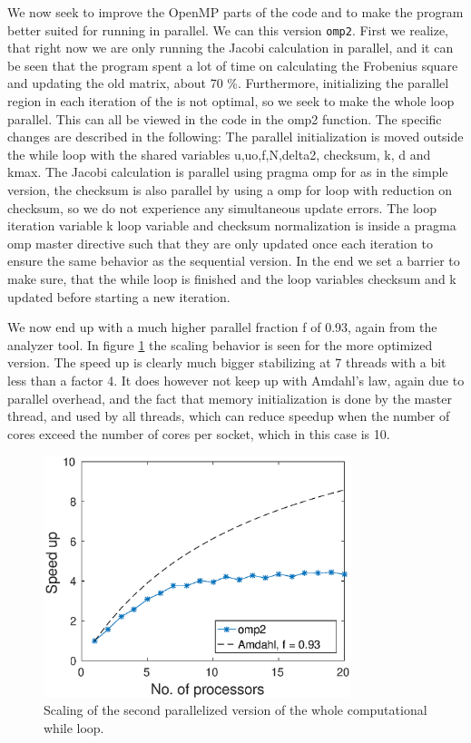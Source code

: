 We now seek to improve the OpenMP parts of the code and to make the program better suited for running in parallel. We can this version \texttt{omp2}. First we realize, that right now we are only running the Jacobi calculation in parallel, and it can be seen that the program spent a lot of time on calculating the Frobenius square and updating the old matrix, about 70 \%. Furthermore, initializing the parallel region in each iteration of the is not optimal, so we seek to make the whole loop parallel. This can all be viewed in the code in the omp2 function. The specific changes are described in the following: The parallel initialization is moved outside the while loop with the shared variables u,uo,f,N,delta2, checksum, k, d and kmax. The Jacobi calculation is parallel using pragma omp for as in the simple version, the checksum is also parallel by using a omp for loop with reduction on checksum, so we do not experience any simultaneous update errors. The loop iteration variable k loop variable and checksum normalization is inside a pragma omp master directive such that they are only updated once each iteration to ensure the same behavior as the sequential version. In the end we set a barrier to make sure, that the while loop is finished and the loop variables checksum and k updated before starting a new iteration.

We now end up with a much higher parallel fraction f of 0.93, again from the analyzer tool. In figure \ref{fig:omp2_scale} the scaling behavior is seen for the more optimized version. The speed up is clearly much bigger stabilizing at 7 threads with a bit less than a factor 4. It does however not keep up with Amdahl's law, again due to parallel overhead, and the fact that memory initialization is done by the master thread, and used by all threads, which can reduce speedup when the number of cores exceed the number of cores per socket, which in this case is 10.

\begin{figure}[h!]
\centering
\includegraphics[width = 0.8\textwidth]{fig/speedup_omp2.eps}
\caption{Scaling of the second parallelized version of the whole computational while loop.}
\label{fig:omp2_scale}
\end{figure}


